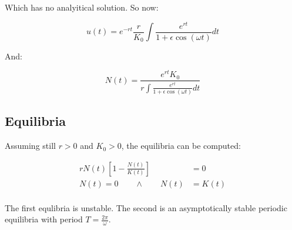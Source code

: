   Which has no analyitical solution.
  So now:

  $$u(t) = e^{-rt}\frac{r}{K_0}\int \frac{e^{rt}}{1+\epsilon\cos(\omega t)}dt$$

  And:

  $$N(t) = \frac{e^{rt}K_0}{r\int \frac{e^{rt}}{1+\epsilon\cos(\omega t)}dt}$$

  \subsection{Equilibria}
  Assuming still $r>0$ and $K_0>0$, the equilibria can be computed:

  \begin{align*}
    rN(t)\left[1-\frac{N(t)}{K(t)}\right] &= 0\\
    N(t) = 0\qquad\land\qquad N(t) &= K(t)\\
  \end{align*}

  The first equlibria is unstable.
  The second is an asymptotically stable periodic equilibria with period $T = \frac{2\pi}{\omega}$.


